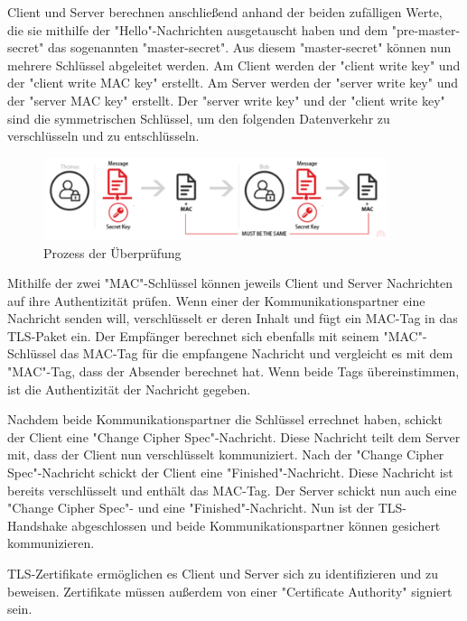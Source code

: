 Client und Server berechnen anschließend anhand der beiden zufälligen Werte, die sie mithilfe der "Hello"-Nachrichten ausgetauscht haben und dem "pre-master-secret" das sogenannten "master-secret". Aus diesem "master-secret" können nun mehrere Schlüssel abgeleitet werden. Am Client werden der "client write key" und der "client write MAC key" erstellt. Am Server werden der "server write key" und der "server MAC key" erstellt. Der "server write key" und der "client write key" sind die symmetrischen Schlüssel, um den folgenden Datenverkehr zu verschlüsseln und zu entschlüsseln. \cite{WikiTLS}

\begin{figure}[H]
    \centering
    \includegraphics[width=0.9\textwidth]{media/OpenSSL/key.png}
    \caption{Prozess der Überprüfung \cite{TerminologyTLS}} 
\end{figure}

Mithilfe der zwei "MAC"-Schlüssel können jeweils Client und Server Nachrichten auf ihre Authentizität prüfen. Wenn einer der Kommunikationspartner eine Nachricht senden will, verschlüsselt er deren Inhalt und fügt ein MAC-Tag in das TLS-Paket ein. Der Empfänger berechnet sich ebenfalls mit seinem "MAC"-Schlüssel das MAC-Tag für die empfangene Nachricht und vergleicht es mit dem "MAC"-Tag, dass der Absender berechnet hat. Wenn beide Tags übereinstimmen, ist die Authentizität der Nachricht gegeben.

Nachdem beide Kommunikationspartner die Schlüssel errechnet haben, schickt der Client eine "Change Cipher Spec"-Nachricht. Diese Nachricht teilt dem Server mit, dass der Client nun verschlüsselt kommuniziert. Nach der "Change Cipher Spec"-Nachricht schickt der Client eine "Finished"-Nachricht. Diese Nachricht ist bereits verschlüsselt und enthält das MAC-Tag. Der Server schickt nun auch eine "Change Cipher Spec"- und eine "Finished"-Nachricht. Nun ist der TLS-Handshake abgeschlossen und beide Kommunikationspartner können gesichert kommunizieren. \cite{SessionKeyTLS}


TLS-Zertifikate ermöglichen es Client und Server sich zu identifizieren und zu beweisen. Zertifikate müssen außerdem von einer "Certificate Authority" signiert sein. 

